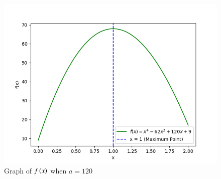 \documentclass[journal]{IEEEtran}
\begin{document}
\begin{figure}[h!]
   \centering
   \includegraphics[width=\columnwidth]{figs/fig2.png}
   \caption{Graph of $f\left(x\right)$ when $a = 120$}
   \label{stemplot}
\end{figure}
\end{document}

